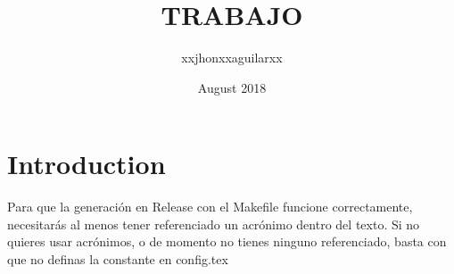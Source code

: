 \documentclass{article}
\title{TRABAJO}
\author{xxjhonxxaguilarxx }
\date{August 2018}
\begin{document}
\maketitle

\section{Introduction}

Para  que  la  generación   en  Release  con  el  Makefile  funcione
correctamente, necesitarás  al menos tener  referenciado un acrónimo
dentro del  texto.  Si  no quieres usar  acrónimos, o de  momento no
tienes ninguno  referenciado, basta con que no  definas la constante
\acronimosEnRelease en config.tex

\end{document}
